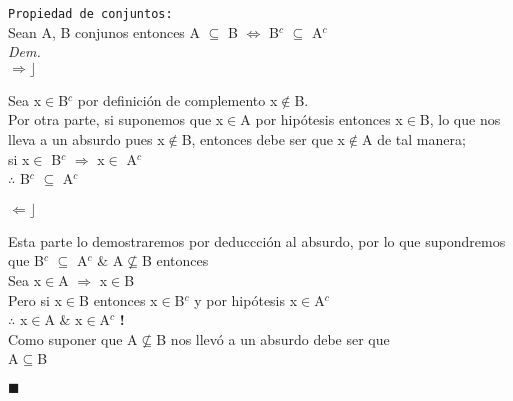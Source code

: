 \documentclass[a4paper, 11pt]{article}
\begin{document}
\texttt{Propiedad de conjuntos:}\\
Sean A, B conjunos entonces A $\subseteq$ B $\Leftrightarrow$ B$^c$ $\subseteq$ A$^c$\\
\textit{Dem.}\\
$\Rightarrow \rfloor$
\begin{center}
Sea x$\in$B$^c$ por definici\'on de complemento x$\notin$B. \\Por otra parte, si suponemos que  x$\in$A por hip\'otesis entonces x$\in$B, lo que nos lleva a un absurdo pues  x$\notin$B, entonces debe ser que  x$\notin$A de tal manera;\\  si x$\in$ B$^c$ $\Rightarrow$ x$\in$ A$^c$ \\
$\therefore$ B$^c$ $\subseteq$ A$^c$
\end{center}
$\Leftarrow \rfloor$
\begin{center}
Esta parte lo demostraremos por deduccci\'on al absurdo, por lo que supondremos que B$^c$ $\subseteq$ A$^c$ \& A$\nsubseteq$B entonces\\

Sea x$\in$A $\Rightarrow$ x$\in$B\\
Pero si x$\in$B entonces x$\in$B$^c$ y por hip\'otesis x$\in$A$^c$\\
$\therefore$ x$\in$A \& x$\in$A$^c$ \textbf{!}\\
Como suponer que A$\nsubseteq$B nos llev\'o a un absurdo debe ser que \\
A$\subseteq$B
\end{center}
\begin{flushright}
$\blacksquare$
\end{flushright}
\end{document}
